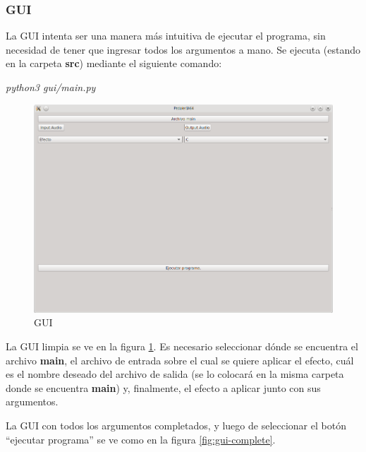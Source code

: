 \subsubsection{GUI}
\label{subsec:gui}
La GUI intenta ser una manera más intuitiva de ejecutar el programa, sin necesidad de tener que ingresar todos los argumentos a mano. Se ejecuta (estando en la carpeta \textbf{src}) mediante el siguiente comando:

\begin{center}\textit{python3 gui/main.py}\end{center}\vspace{\baselineskip}

\begin{figure}[H]
    \centering
    \includegraphics[scale=0.68]{imagenes/gui.png}
    \caption{GUI}
    \label{fig:gui}
\end{figure}

La GUI limpia se ve en la figura \ref{fig:gui}. Es necesario seleccionar dónde se encuentra el archivo \textbf{main}, el archivo de entrada sobre el cual se quiere aplicar el efecto, cuál es el nombre deseado del archivo de salida (se lo colocará en la misma carpeta donde se encuentra \textbf{main}) y, finalmente, el efecto a aplicar junto con sus argumentos.\vspace{\baselineskip}

La GUI con todos los argumentos completados, y luego de seleccionar el botón ``ejecutar programa'' se ve como en la figura \ref{fig:gui-complete}.\vspace{\baselineskip}

